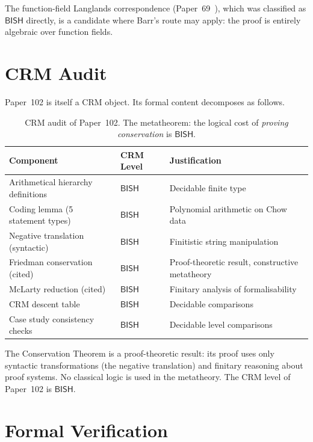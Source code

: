 \documentclass[11pt,a4paper]{article}
\theoremstyle{plain}
\theoremstyle{definition}
\newcommand{\BISH}{\textsf{BISH}}
\begin{document}
The function-field Langlands correspondence (Paper~69~\cite{p69}), which was classified as $\BISH$ directly, is a candidate where Barr's route may apply: the proof is entirely algebraic over function fields.


\section{CRM Audit}\label{sec:audit}

Paper~102 is itself a CRM object.  Its formal content decomposes as follows.

\begin{table}[ht]
\centering
\begin{tabular}{@{}lll@{}}
\toprule
\textbf{Component} & \textbf{CRM Level} & \textbf{Justification} \\
\midrule
Arithmetical hierarchy definitions & $\BISH$ & Decidable finite type \\
Coding lemma (5 statement types) & $\BISH$ & Polynomial arithmetic on Chow data \\
Negative translation (syntactic) & $\BISH$ & Finitistic string manipulation \\
Friedman conservation (cited) & $\BISH$ & Proof-theoretic result, constructive metatheory \\
McLarty reduction (cited) & $\BISH$ & Finitary analysis of formalisability \\
CRM descent table & $\BISH$ & Decidable comparisons \\
Case study consistency checks & $\BISH$ & Decidable level comparisons \\
\bottomrule
\end{tabular}
\caption{CRM audit of Paper~102.  The metatheorem: the logical cost of \emph{proving conservation} is $\BISH$.}
\label{tab:audit}
\end{table}

The Conservation Theorem is a proof-theoretic result: its proof uses only syntactic transformations (the negative translation) and finitary reasoning about proof systems.  No classical logic is used in the metatheory.  The CRM level of Paper~102 is $\BISH$.


\section{Formal Verification}\label{sec:lean}
\end{document}
